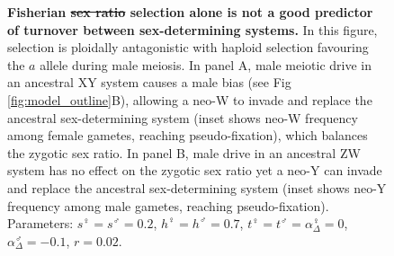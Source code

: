 \documentclass[10pt,letterpaper]{article}
\providecommand{\DIFadd}[1]{{\protect\color{blue}\uwave{#1}}} %
\providecommand{\DIFdel}[1]{{\protect\color{red}\sout{#1}}}                      %
\providecommand{\DIFaddFL}[1]{\DIFadd{#1}} %
\providecommand{\DIFdelFL}[1]{\DIFdel{#1}} %
\providecommand{\DIFaddbeginFL}{} %
\providecommand{\DIFaddendFL}{} %
\providecommand{\DIFdelbeginFL}{} %
\providecommand{\DIFdelendFL}{} %
\begin{document}
\begin{figure}[!h]
\centering
\caption{
{\bf Fisherian \DIFdelbeginFL \DIFdelFL{sex ratio }\DIFdelendFL \DIFaddbeginFL \DIFaddFL{sex-ratio }\DIFaddendFL selection alone is not a good predictor of turnover between sex-determining systems.}
In this figure, selection is ploidally antagonistic with haploid selection favouring the $a$ allele during male meiosis.
In panel A, male meiotic drive in an ancestral XY system causes a male bias (see Fig \ref{fig:model_outline}B), allowing a neo-W to invade and replace the ancestral sex-determining system (inset shows neo-W frequency among female gametes, reaching pseudo-fixation), which balances the zygotic sex ratio.
In panel B, male drive in an ancestral ZW system has no effect on the zygotic sex ratio yet a neo-Y can invade and replace the ancestral sex-determining system (inset shows neo-Y frequency among male gametes, reaching pseudo-fixation). 
Parameters:  $s^\female =s^\male = 0.2$, $h^\female = h^\male = 0.7$, $t^\female = t^\male = \alpha^\female_\Delta = 0$, $\alpha^\male_\Delta = -0.1$, $r=0.02$.
}
\label{fig:SexRatioBad}
\end{figure}
\end{document}
